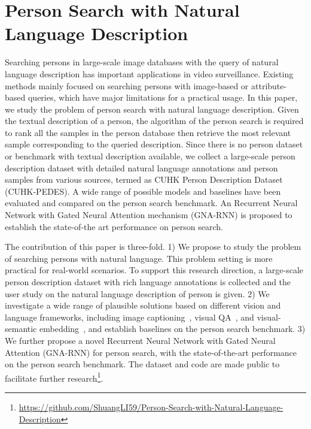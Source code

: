 \chapter{Person Search with Natural Language Description}
\label{ch:person-search-nlp}

Searching persons in large-scale image databases with the query of natural language description has important applications in video surveillance. Existing methods mainly focused on searching persons with image-based or attribute-based queries, which have major limitations for a practical usage. In this paper, we study the problem of person search with natural language description. Given the textual description of a person, the algorithm of the person search is required to rank all the samples in the person database then retrieve the most relevant sample corresponding to the queried description. Since there is no person dataset or benchmark with textual description available, we collect a large-scale person description dataset with detailed natural language annotations and person samples from various sources, termed as CUHK Person Description Dataset (CUHK-PEDES). A wide range of possible models and baselines have been evaluated and compared on the person search benchmark. An Recurrent Neural Network with Gated Neural Attention mechanism (GNA-RNN) is proposed to establish the state-of-the art performance on person search. 

The contribution of this paper is three-fold. 1) We propose to study the problem of searching persons with natural language. This problem setting is more practical for real-world scenarios. To support this research direction, a large-scale person description dataset with rich language annotations is collected and the user study on the natural language description of person is given. 2) We investigate a wide range of plausible solutions based on different vision and language frameworks, including image captioning~\cite{karpathy2015deep, vinyals2015show}, visual QA~\cite{zhou2015simple,ren2015exploring}, and visual-semantic embedding~\cite{reed2016learning}, and establish baselines on the person search benchmark.  3) We further propose a novel Recurrent Neural Network with Gated Neural Attention (GNA-RNN) for person search, with the state-of-the-art performance on the person search benchmark. The dataset and code are made public to facilitate further research\footnote{\url{https://github.com/ShuangLI59/Person-Search-with-Natural-Language-Description}}.


